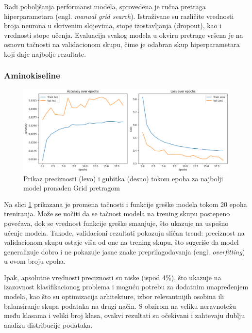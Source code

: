 \documentclass[a4paper,12pt]{article}
\begin{document}
Radi poboljšanja performansi modela, sprovedena je ručna pretraga hiperparametara (engl. \textit{manual grid search}). Istraživane su različite vrednosti broja neurona u skrivenim slojevima, stope izostavljanja (dropout), kao i vrednosti stope učenja. Evaluacija svakog modela u okviru pretrage vršena je na osnovu tačnosti na validacionom skupu, čime je odabran skup hiperparametara koji daje najbolje rezultate.

\subsubsection*{Aminokiseline}

\begin{figure}[htbp]
    \centering
    \includegraphics[width=1\textwidth]{images/epochs_aa.png}
    \caption{Prikaz preciznosti (levo) i gubitka (desno) tokom epoha za najbolji model pronađen Grid pretragom}
    \label{fig:accuracy_loss}
\end{figure}

Na slici \ref{fig:accuracy_loss} prikazana je promena tačnosti i funkcije greške modela tokom 20 epoha treniranja. Može se uočiti da se tačnost modela na trening skupu postepeno povećava, dok se vrednost funkcije greške smanjuje, što ukazuje na uspešno učenje modela. Takođe, validacioni rezultati pokazuju sličan trend: preciznost na validacionom skupu ostaje viša od one na trening skupu, što sugeriše da model generalizuje dobro i ne pokazuje jasne znake preprilagođavanja (engl. \textit{overfitting}) u ovom broju epoha.

Ipak, apsolutne vrednosti preciznosti su niske (ispod 4\%), što ukazuje na izazovnost klasifikacionog problema i moguću potrebu za dodatnim unapređenjem modela, kao što su optimizacija arhitekture, izbor relevantnijih osobina ili balansiranje skupa podataka na drugi način. S obzirom na veliku neravnotežu među klasama i veliki broj klasa, ovakvi rezultati su očekivani i zahtevaju dublju analizu distribucije podataka.
\end{document}
